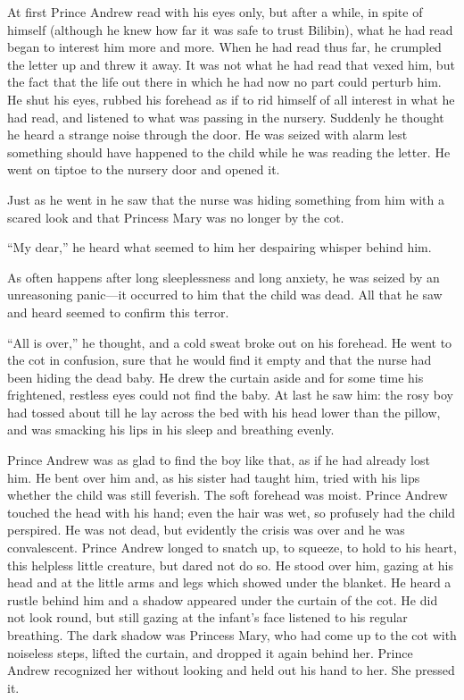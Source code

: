 At first Prince Andrew read with his eyes only, but after a
while, in spite of himself (although he knew how far it was safe
to trust Bilibin), what he had read began to interest him more
and more. When he had read thus far, he crumpled the letter up
and threw it away. It was not what he had read that vexed him,
but the fact that the life out there in which he had now no part
could perturb him. He shut his eyes, rubbed his forehead as if to
rid himself of all interest in what he had read, and listened to
what was passing in the nursery. Suddenly he thought he heard a
strange noise through the door. He was seized with alarm lest
something should have happened to the child while he was reading
the letter. He went on tiptoe to the nursery door and opened it.

Just as he went in he saw that the nurse was hiding something
from him with a scared look and that Princess Mary was no longer
by the cot.

``My dear,'' he heard what seemed to him her despairing whisper
behind him.

As often happens after long sleeplessness and long anxiety, he
was seized by an unreasoning panic---it occurred to him that the
child was dead. All that he saw and heard seemed to confirm this
terror.

``All is over,'' he thought, and a cold sweat broke out on his
forehead.  He went to the cot in confusion, sure that he would
find it empty and that the nurse had been hiding the dead
baby. He drew the curtain aside and for some time his frightened,
restless eyes could not find the baby.  At last he saw him: the
rosy boy had tossed about till he lay across the bed with his
head lower than the pillow, and was smacking his lips in his
sleep and breathing evenly.

Prince Andrew was as glad to find the boy like that, as if he had
already lost him. He bent over him and, as his sister had taught
him, tried with his lips whether the child was still
feverish. The soft forehead was moist. Prince Andrew touched the
head with his hand; even the hair was wet, so profusely had the
child perspired. He was not dead, but evidently the crisis was
over and he was convalescent. Prince Andrew longed to snatch up,
to squeeze, to hold to his heart, this helpless little creature,
but dared not do so. He stood over him, gazing at his head and at
the little arms and legs which showed under the blanket. He heard
a rustle behind him and a shadow appeared under the curtain of
the cot. He did not look round, but still gazing at the infant's
face listened to his regular breathing. The dark shadow was
Princess Mary, who had come up to the cot with noiseless steps,
lifted the curtain, and dropped it again behind her. Prince
Andrew recognized her without looking and held out his hand to
her. She pressed it.

